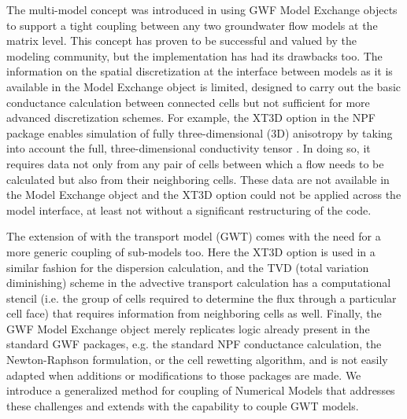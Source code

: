 The multi-model concept was introduced in \mf using GWF Model Exchange objects to support a tight coupling between any two groundwater flow models at the matrix level. This concept has proven to be successful and valued by the modeling community, but the implementation has had its drawbacks too. The information on the spatial discretization at the interface between models as it is available in the Model Exchange object is limited, designed to carry out the basic conductance calculation between connected cells but not sufficient for more advanced discretization schemes. For example, the XT3D option in the NPF package enables simulation of fully three-dimensional (3D) anisotropy by taking into account the full, three-dimensional conductivity tensor \cite{modflow6xt3d}. In doing so, it requires data not only from any pair of cells between which a flow needs to be calculated but also from their neighboring cells. These data are not available in the Model Exchange object and the XT3D option could not be applied across the model interface, at least not without a significant restructuring of the code.

The extension of \mf with the transport model (GWT) comes with the need for a more generic coupling of sub-models too. Here the XT3D option is used in a similar fashion for the dispersion calculation, and the TVD (total variation diminishing) scheme in the advective transport calculation has a computational stencil (i.e. the group of cells required to determine the flux through a particular cell face) that requires information from neighboring cells as well. Finally, the GWF Model Exchange object merely replicates logic already present in the standard GWF packages, e.g. the standard NPF conductance calculation, the Newton-Raphson formulation, or the cell rewetting algorithm, and is not easily adapted when additions or modifications to those packages are made. We introduce a generalized method for coupling of Numerical Models that addresses these challenges and extends \mf with the capability to couple GWT models.

